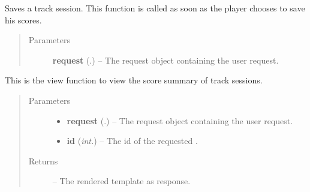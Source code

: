\documentclass[letterpaper,10pt,english]{sphinxmanual}
\begin{document}
\begin{fulllineitems}
\label{Contour.contour:Contour.contour.views.save_session}
Saves a track session. This function is called as soon as the player chooses to save his scores.
\begin{quote}\begin{description}
\item[{Parameters}] \leavevmode
\textbf{request} (.) -- The request object containing the user request.

\end{description}\end{quote}

\end{fulllineitems}


\begin{fulllineitems}
\label{Contour.contour:Contour.contour.views.session}
This is the view function to view the score summary of track sessions.
\begin{quote}\begin{description}
\item[{Parameters}] \leavevmode\begin{itemize}
\item {} 
\textbf{request} (.) -- The request object containing the user request.

\item {} 
\textbf{id} (\emph{int.}) -- The id of the requested {\hyperref[Contour.contour:Contour.contour.models.TrackSession]{}}.

\end{itemize}

\item[{Returns}] \leavevmode
{} -- The rendered template as response.

\end{description}\end{quote}

\end{fulllineitems}

\end{document}
